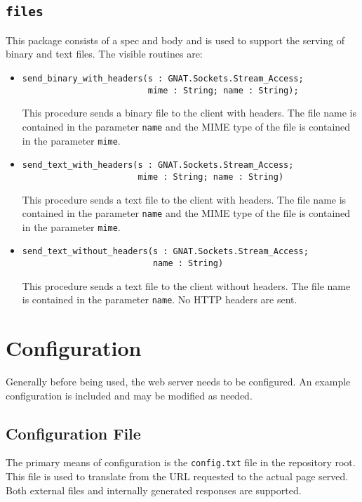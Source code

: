 \documentclass[10pt, openany, draft]{article}
\begin{document}
\subsection{\texttt{files}}
This package consists of a spec and body and is used to support the serving of binary and text files.  The visible routines are:
\begin{itemize}
  \item \begin{verbatim}send_binary_with_headers(s : GNAT.Sockets.Stream_Access;
                         mime : String; name : String);
            \end{verbatim}
  This procedure sends a binary file to the client with headers.  The file name is contained in the parameter \texttt{name} and the MIME type of the file is contained in the parameter \texttt{mime}.

  \item \begin{verbatim}send_text_with_headers(s : GNAT.Sockets.Stream_Access;
                       mime : String; name : String)
  \end{verbatim}
  This procedure sends a text file to the client with headers.  The file name is contained in the parameter \texttt{name} and the MIME type of the file is contained in the parameter \texttt{mime}.

  \item \begin{verbatim}send_text_without_headers(s : GNAT.Sockets.Stream_Access;
                          name : String)
  \end{verbatim}
  This procedure sends a text file to the client without headers.  The file name is contained in the parameter \texttt{name}.  No HTTP headers are sent.
\end{itemize}

\section{Configuration}
Generally before being used, the web server needs to be configured.  An example configuration is included and may be modified as needed.

\subsection{Configuration File}
The primary means of configuration is the \texttt{config.txt} file in the repository root.  This file is used to translate from the URL requested to the actual page served.  Both external files and internally generated responses are supported.
\end{document}
